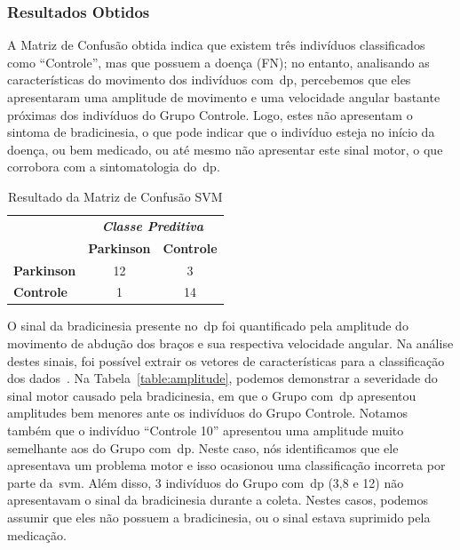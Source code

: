 \subsubsection{Resultados Obtidos}\label{sec:resultado_obtido_svm}


A Matriz de Confusão obtida indica que existem três indivíduos classificados como ``Controle'', mas que possuem a doença (FN); no entanto, analisando as características do movimento dos indivíduos com~\ac{dp}, percebemos que eles apresentaram uma amplitude de movimento e uma velocidade angular bastante próximas dos indivíduos do Grupo Controle. Logo, estes não apresentam o sintoma de bradicinesia, o que pode indicar que o indivíduo esteja no início da doença, ou bem medicado, ou até mesmo não apresentar este sinal motor, o que corrobora com a sintomatologia do~\ac{dp}. 


\begin{table}[!htbp] 
\caption{Resultado da Matriz de Confusão SVM}
\label{table:resultadomatrizconfusaosvm}
\centering
\begin{tabular}{l|c|c|}
\cline{2-3}
\multicolumn{1}{c}{}                         & \multicolumn{2}{|c|}{\textit{\textbf{Classe Preditiva}}} \\ \cline{2-3} 
                                             & \textbf{Parkinson}      & \textbf{Controle}         \\ \hline
\multicolumn{1}{|l|}{\textbf{Parkinson}} & 12       & 3           \\ \hline
\multicolumn{1}{|l|}{\textbf{Controle}}     & 1           & 14     \\ \hline
\end{tabular}

\end{table}

O sinal da bradicinesia presente no~\ac{dp} foi quantificado pela amplitude do movimento de abdução dos braços e sua respectiva velocidade angular. Na análise destes sinais, foi possível extrair os vetores de características para a classificação dos dados~\cite{kantardzic2011data}. Na Tabela~\ref{table:amplitude}, podemos demonstrar a severidade do sinal motor causado pela bradicinesia, em que o Grupo com~\ac{dp} apresentou amplitudes bem menores ante os indivíduos do Grupo Controle. Notamos também que o indivíduo ``Controle 10'' apresentou uma amplitude muito semelhante aos do Grupo com~\ac{dp}. Neste caso, nós identificamos que ele apresentava um problema motor e isso ocasionou uma classificação incorreta por parte da~\ac{svm}. Além disso, 3 indivíduos do Grupo com~\ac{dp} (3,8 e 12) não apresentavam o sinal da bradicinesia durante a coleta. Nestes casos, podemos assumir que eles não possuem a bradicinesia, ou o sinal estava suprimido pela medicação.


